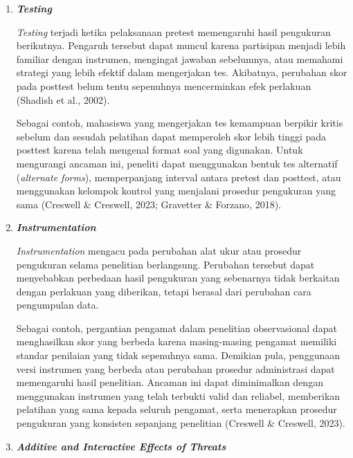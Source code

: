 \documentclass[
  indonesian,
  letterpaper,
  DIV=11,
  numbers=noendperiod]{scrreprt}
\begin{document}
\begin{enumerate}
  \emph{Attrition} atau \emph{experimental mortality} terjadi ketika
  sebagian partisipan tidak menyelesaikan penelitian sehingga jumlah
  atau karakteristik partisipan pada akhir penelitian berbeda dengan
  kondisi awal. Ancaman ini menjadi masalah apabila partisipan yang
  keluar memiliki karakteristik tertentu yang dapat memengaruhi hasil
  penelitian.

  Sebagai contoh, dalam penelitian mengenai efektivitas program
  penurunan berat badan, peserta yang merasa program terlalu berat
  mungkin memilih mengundurkan diri. Akibatnya, hanya peserta yang
  memiliki motivasi tinggi yang menyelesaikan penelitian sehingga
  efektivitas program tampak lebih besar daripada kondisi sebenarnya.
  Untuk meminimalkan ancaman ini, peneliti perlu menjaga keterlibatan
  partisipan selama penelitian, mengurangi beban partisipasi, dan
  mempertimbangkan kemungkinan kehilangan partisipan sejak tahap
  perencanaan penelitian (Creswell \& Creswell, 2023).
\item
  \textbf{\emph{Testing}}

  \emph{Testing} terjadi ketika pelaksanaan pretest memengaruhi hasil
  pengukuran berikutnya. Pengaruh tersebut dapat muncul karena
  partisipan menjadi lebih familiar dengan instrumen, mengingat jawaban
  sebelumnya, atau memahami strategi yang lebih efektif dalam
  mengerjakan tes. Akibatnya, perubahan skor pada posttest belum tentu
  sepenuhnya mencerminkan efek perlakuan (Shadish et al., 2002).

  Sebagai contoh, mahasiswa yang mengerjakan tes kemampuan berpikir
  kritis sebelum dan sesudah pelatihan dapat memperoleh skor lebih
  tinggi pada posttest karena telah mengenal format soal yang digunakan.
  Untuk mengurangi ancaman ini, peneliti dapat menggunakan bentuk tes
  alternatif (\emph{alternate forms}), memperpanjang interval antara
  pretest dan posttest, atau menggunakan kelompok kontrol yang menjalani
  prosedur pengukuran yang sama (Creswell \& Creswell, 2023; Gravetter
  \& Forzano, 2018).
\item
  \textbf{\emph{Instrumentation}}

  \emph{Instrumentation} mengacu pada perubahan alat ukur atau prosedur
  pengukuran selama penelitian berlangsung. Perubahan tersebut dapat
  menyebabkan perbedaan hasil pengukuran yang sebenarnya tidak berkaitan
  dengan perlakuan yang diberikan, tetapi berasal dari perubahan cara
  pengumpulan data.

  Sebagai contoh, pergantian pengamat dalam penelitian observasional
  dapat menghasilkan skor yang berbeda karena masing-masing pengamat
  memiliki standar penilaian yang tidak sepenuhnya sama. Demikian pula,
  penggunaan versi instrumen yang berbeda atau perubahan prosedur
  administrasi dapat memengaruhi hasil penelitian. Ancaman ini dapat
  diminimalkan dengan menggunakan instrumen yang telah terbukti valid
  dan reliabel, memberikan pelatihan yang sama kepada seluruh pengamat,
  serta menerapkan prosedur pengukuran yang konsisten sepanjang
  penelitian (Creswell \& Creswell, 2023).
\item
  \textbf{\emph{Additive and Interactive Effects of Threats}}


\end{enumerate}
\end{document}
